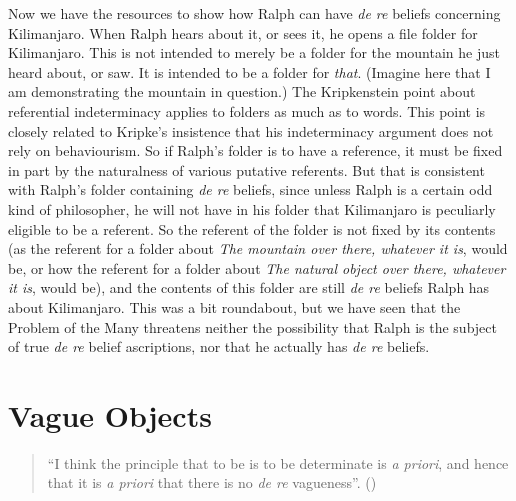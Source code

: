 \documentclass[
  10pt,
  letterpaper,
  DIV=11,
  numbers=noendperiod,
  twoside]{scrartcl}
\begin{document}
Now we have the resources to show how Ralph can have \emph{de re}
beliefs concerning Kilimanjaro. When Ralph hears about it, or sees it,
he opens a file folder for Kilimanjaro. This is not intended to merely
be a folder for the mountain he just heard about, or saw. It is intended
to be a folder for \emph{that}. (Imagine here that I am demonstrating
the mountain in question.) The Kripkenstein point about referential
indeterminacy applies to folders as much as to words. This point is
closely related to Kripke's insistence that his indeterminacy argument
does not rely on behaviourism. So if Ralph's folder is to have a
reference, it must be fixed in part by the naturalness of various
putative referents. But that is consistent with Ralph's folder
containing \emph{de re} beliefs, since unless Ralph is a certain odd
kind of philosopher, he will not have in his folder that Kilimanjaro is
peculiarly eligible to be a referent. So the referent of the folder is
not fixed by its contents (as the referent for a folder about \emph{The
mountain over there, whatever it is}, would be, or how the referent for
a folder about \emph{The natural object over there, whatever it is},
would be), and the contents of this folder are still \emph{de re}
beliefs Ralph has about Kilimanjaro. This was a bit roundabout, but we
have seen that the Problem of the Many threatens neither the possibility
that Ralph is the subject of true \emph{de re} belief ascriptions, nor
that he actually has \emph{de re} beliefs.

\section{Vague Objects}\label{vague-objects}

\begin{quote}
``I think the principle that to be is to be determinate is \emph{a
priori}, and hence that it is \emph{a priori} that there is no \emph{de
re} vagueness''. ()
\end{quote}
\end{document}
